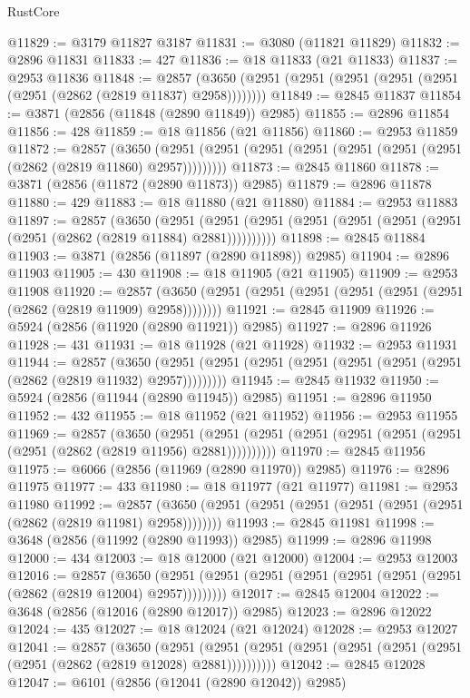 \begin{lexlean}{RustCore}
\begin{coremodule}
@11829 := @3179 @11827 @3187
@11831 := @3080 (@11821 @11829)
@11832 := @2896 @11831
@11833 := 427
@11836 := @18 @11833 (@21 @11833)
@11837 := @2953 @11836
@11848 := @2857 (@3650 (@2951 (@2951 (@2951 (@2951 (@2951 (@2951 (@2862 (@2819 @11837) @2958))))))))
@11849 := @2845 @11837
@11854 := @3871 (@2856 (@11848 (@2890 @11849)) @2985)
@11855 := @2896 @11854
@11856 := 428
@11859 := @18 @11856 (@21 @11856)
@11860 := @2953 @11859
@11872 := @2857
    (@3650 (@2951 (@2951 (@2951 (@2951 (@2951 (@2951 (@2951 (@2862 (@2819 @11860) @2957)))))))))
@11873 := @2845 @11860
@11878 := @3871 (@2856 (@11872 (@2890 @11873)) @2985)
@11879 := @2896 @11878
@11880 := 429
@11883 := @18 @11880 (@21 @11880)
@11884 := @2953 @11883
@11897 := @2857
    (@3650
      (@2951 (@2951 (@2951 (@2951 (@2951 (@2951 (@2951 (@2951 (@2862 (@2819 @11884) @2881))))))))))
@11898 := @2845 @11884
@11903 := @3871 (@2856 (@11897 (@2890 @11898)) @2985)
@11904 := @2896 @11903
@11905 := 430
@11908 := @18 @11905 (@21 @11905)
@11909 := @2953 @11908
@11920 := @2857 (@3650 (@2951 (@2951 (@2951 (@2951 (@2951 (@2951 (@2862 (@2819 @11909) @2958))))))))
@11921 := @2845 @11909
@11926 := @5924 (@2856 (@11920 (@2890 @11921)) @2985)
@11927 := @2896 @11926
@11928 := 431
@11931 := @18 @11928 (@21 @11928)
@11932 := @2953 @11931
@11944 := @2857
    (@3650 (@2951 (@2951 (@2951 (@2951 (@2951 (@2951 (@2951 (@2862 (@2819 @11932) @2957)))))))))
@11945 := @2845 @11932
@11950 := @5924 (@2856 (@11944 (@2890 @11945)) @2985)
@11951 := @2896 @11950
@11952 := 432
@11955 := @18 @11952 (@21 @11952)
@11956 := @2953 @11955
@11969 := @2857
    (@3650
      (@2951 (@2951 (@2951 (@2951 (@2951 (@2951 (@2951 (@2951 (@2862 (@2819 @11956) @2881))))))))))
@11970 := @2845 @11956
@11975 := @6066 (@2856 (@11969 (@2890 @11970)) @2985)
@11976 := @2896 @11975
@11977 := 433
@11980 := @18 @11977 (@21 @11977)
@11981 := @2953 @11980
@11992 := @2857 (@3650 (@2951 (@2951 (@2951 (@2951 (@2951 (@2951 (@2862 (@2819 @11981) @2958))))))))
@11993 := @2845 @11981
@11998 := @3648 (@2856 (@11992 (@2890 @11993)) @2985)
@11999 := @2896 @11998
@12000 := 434
@12003 := @18 @12000 (@21 @12000)
@12004 := @2953 @12003
@12016 := @2857
    (@3650 (@2951 (@2951 (@2951 (@2951 (@2951 (@2951 (@2951 (@2862 (@2819 @12004) @2957)))))))))
@12017 := @2845 @12004
@12022 := @3648 (@2856 (@12016 (@2890 @12017)) @2985)
@12023 := @2896 @12022
@12024 := 435
@12027 := @18 @12024 (@21 @12024)
@12028 := @2953 @12027
@12041 := @2857
    (@3650
      (@2951 (@2951 (@2951 (@2951 (@2951 (@2951 (@2951 (@2951 (@2862 (@2819 @12028) @2881))))))))))
@12042 := @2845 @12028
@12047 := @6101 (@2856 (@12041 (@2890 @12042)) @2985)

\end{coremodule}
\end{lexlean}
